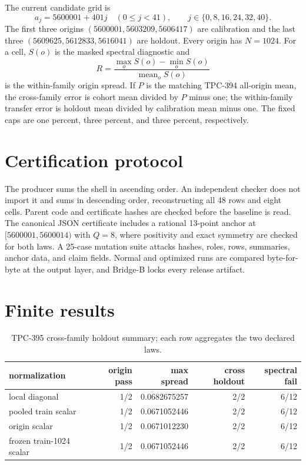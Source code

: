 \documentclass[10pt]{article}
\begin{document}
The current candidate grid is
\[
 a_j=5600001+401j\quad(0\leq j<41),
 \qquad j\in\{0,8,16,24,32,40\}.
\]
The first three origins $(5600001,5603209,5606417)$ are calibration and the
last three $(5609625,5612833,5616041)$ are holdout.  Every origin has
$N=1024$.  For a cell, $S(o)$ is the masked spectral diagnostic and
\[
 R=\frac{\max_o S(o)-\min_o S(o)}{\operatorname{mean}_o S(o)}
\]
is the within-family origin spread.  If $P$ is the matching TPC-394
all-origin mean, the cross-family error is cohort mean divided by $P$ minus one;
the within-family transfer error is holdout mean divided by calibration mean
minus one.  The fixed caps are
one percent, three percent, and three percent, respectively.

\section{Certification protocol}

The producer sums the shell in ascending order.  An independent checker does
not import it and sums in descending order, reconstructing all 48 rows and
eight cells.  Parent code and certificate hashes are checked before the
baseline is read.  The canonical JSON certificate includes a rational
13-point anchor at $[5600001,5600014)$ with $Q=8$, where positivity and exact
symmetry are checked for both laws.  A 25-case mutation suite attacks hashes,
roles, rows, summaries, anchor data, and claim fields.  Normal and optimized
runs are compared byte-for-byte at the output layer, and Bridge-B locks every
release artifact.

\section{Finite results}

\begin{table}[t]
\centering
\caption{TPC-395 cross-family holdout summary; each row aggregates the two
declared laws.}
\small
\begin{tabular}{@{}l r r r r@{}}
\toprule
normalization & origin pass & max spread & cross holdout & spectral fail\\
\midrule
local diagonal & 1/2 & 0.0682675257 & 2/2 & 6/12\\
pooled train scalar & 1/2 & 0.0671052446 & 2/2 & 6/12\\
origin scalar & 1/2 & 0.0671012230 & 2/2 & 6/12\\
frozen train-1024 scalar & 1/2 & 0.0671052446 & 2/2 & 6/12\\
\bottomrule
\end{tabular}
\end{table}
\end{document}
